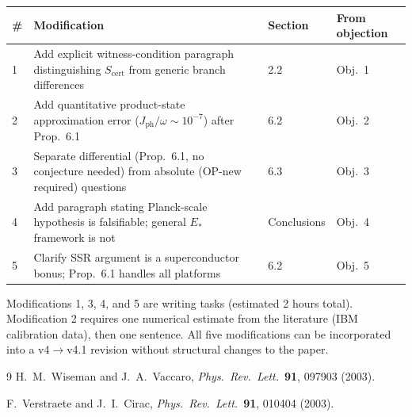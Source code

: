 \documentclass[11pt,letterpaper]{article}
\newcommand{\Scert}{S_{\mathrm{cert}}}
\begin{document}
\begin{center}\small
\begin{tabular}{@{}p{0.5cm}p{6cm}p{2.5cm}p{3cm}@{}}
\toprule
\# & Modification & Section & From objection \\
\midrule
1 & Add explicit witness-condition paragraph distinguishing $\Scert$ from generic branch differences & 2.2 & Obj.~1 \\
2 & Add quantitative product-state approximation error ($J_{\mathrm{ph}}/\omega \sim 10^{-7}$) after Prop.~6.1 & 6.2 & Obj.~2 \\
3 & Separate differential (Prop.~6.1, no conjecture needed) from absolute (OP-new required) questions & 6.3 & Obj.~3 \\
4 & Add paragraph stating Planck-scale hypothesis is falsifiable; general $E_*$ framework is not & Conclusions & Obj.~4 \\
5 & Clarify SSR argument is a superconductor bonus; Prop.~6.1 handles all platforms & 6.2 & Obj.~5 \\
\bottomrule
\end{tabular}
\end{center}

Modifications 1, 3, 4, and 5 are writing tasks (estimated 2 hours total).
Modification 2 requires one numerical estimate from the literature (IBM calibration data),
then one sentence.  All five modifications can be incorporated into a v4$\to$v4.1
revision without structural changes to the paper.

\begin{thebibliography}{9}
H.~M.~Wiseman and J.~A.~Vaccaro,
\textit{Phys.\ Rev.\ Lett.}\ \textbf{91}, 097903 (2003).

F.~Verstraete and J.~I.~Cirac,
\textit{Phys.\ Rev.\ Lett.}\ \textbf{91}, 010404 (2003).
\end{thebibliography}
\end{document}
